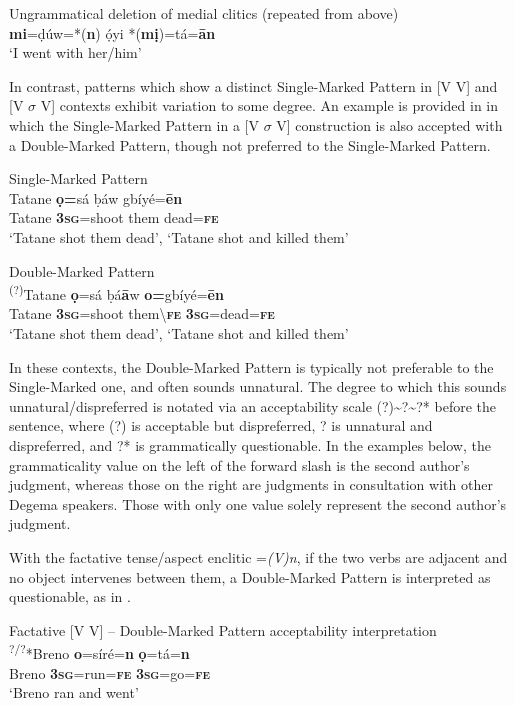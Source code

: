 \documentclass[output=paper]{langsci/langscibook}
\begin{document}
\ea
{Ungrammatical deletion of medial clitics (repeated from  above)}\\
\textbf{mi}=ḍúw=*(\textbf{n})   ọ́yi   *(\textbf{mị})=tá=\textbf{ān}\\
\glt ‘I went with her/him’ \citep[201]{Kari2004}
\z

In contrast, patterns which show a distinct Single-Marked Pattern in [V V] and [V $\sigma $ V] contexts exhibit variation to some degree. An example is provided in  in which the Single-Marked Pattern in a [V $\sigma $ V] construction is also accepted with a Double-Marked Pattern, though not preferred to the Single-Marked Pattern.

\ea
Single-Marked Pattern\\
\gll    Tatane  \textbf{ọ=}sá    ḅáw   gbíyé=\textbf{ēn}\\
     Tatane  \textbf{3}\textbf{\textsc{sg}}=shoot  them   dead=\textbf{\textsc{fe}}\\
\glt ‘Tatane shot them dead’, ‘Tatane shot and killed them’ 

\ex
 Double-Marked Pattern\\
\ea
\gll  \textsuperscript{(?)}Tatane  \textbf{ọ}=sá    ḅá\textbf{ā}w    \textbf{o=}gbíyé=\textbf{ēn}\\
     Tatane  \textbf{3\textsc{sg}}=shoot   them{\textbackslash}\textbf{\textsc{fe}}    \textbf{3\textsc{sg}}=dead=\textbf{\textsc{fe}}\\
\glt ‘Tatane shot them dead’, ‘Tatane shot and killed them’
\z
\z

In these contexts, the Double-Marked Pattern is typically not preferable to the Single-Marked one, and often sounds unnatural. The degree to which this sounds unnatural/dispreferred is notated via an acceptability scale (?){\textasciitilde}?{\textasciitilde}?* before the sentence, where (?) is acceptable but dispreferred, ? is unnatural and dispreferred, and ?* is grammatically questionable. In the examples below, the grammaticality value on the left of the forward slash is the second author’s judgment, whereas those on the right are judgments in consultation with other Degema speakers. Those with only one value solely represent the second author’s judgment.

With the factative tense/aspect enclitic =\textit{(V)n}, if the two verbs are adjacent and no object intervenes between them, a Double-Marked Pattern is interpreted as questionable, as in . 

\ea
{Factative [V V] – Double-Marked Pattern acceptability interpretation}\\
\gll  \textsuperscript{?/?}*Breno   \textbf{o}=síré=\textbf{n}     \textbf{ọ}=tá=\textbf{n}\\
     Breno  \textbf{\textsc{3sg}}=run=\textbf{\textsc{fe}}    \textbf{\textsc{3sg}}=go=\textbf{\textsc{fe}}\\
\glt ‘Breno ran and went’
\z
\end{document}
